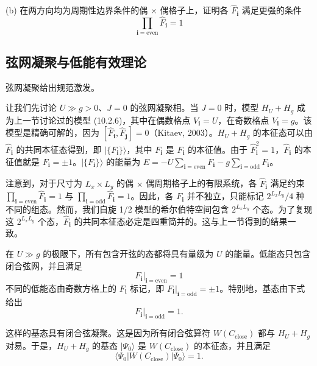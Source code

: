 (b) 在两方向均为周期性边界条件的偶 $\times$ 偶格子上，证明各 $\hat F_{\pmb{i}}$ 满足更强的条件
\begin{equation*}
\prod_{\pmb{i}=\mathrm{even}}\hat F_{\pmb{i}}=1\tag{10.3.4}
\end{equation*}

\subsection{弦网凝聚与低能有效理论}

\begin{keypoints}\item 弦网凝聚给出规范激发。\end{keypoints}

让我们先讨论 $U\gg g>0$、$J=0$ 的弦网凝聚相。当 $J=0$ 时，模型 $H_U+H_g$ 成为上一节讨论过的模型 (10.2.6)，其中在偶数格点 $V_{\pmb{i}}=U$，在奇数格点 $V_{\pmb{i}}=g$。该模型是精确可解的，因为 $[\hat F_{\pmb{i}},\hat F_{\pmb{j}}]=0$（Kitaev, 2003）。$H_U+H_g$ 的本征态可以由 $\hat F_{\pmb{i}}$ 的共同本征态得到，即 $|\{F_{\pmb{i}}\}\rangle$，其中 $F_{\pmb{i}}$ 是 $\hat F_{\pmb{i}}$ 的本征值。由于 $\hat F_{\pmb{i}}^{2}=1$，$\hat F_{\pmb{i}}$ 的本征值就是 $F_{\pmb{i}}=\pm1$。$|\{F_{\pmb{i}}\}\rangle$ 的能量为 $E=-U\sum_{\pmb{i}=\mathrm{even}}F_{\pmb{i}}-g\sum_{\pmb{i}=\mathrm{odd}}F_{\pmb{i}}$。

注意到，对于尺寸为 $L_x\times L_y$ 的偶 $\times$ 偶周期格子上的有限系统，各 $\hat F_{\pmb{i}}$ 满足约束 $\prod_{\pmb{i}=\mathrm{even}}\hat F_{\pmb{i}}=1$ 与 $\prod_{\pmb{i}=\mathrm{odd}}\hat F_{\pmb{i}}=1$。因此，各 $F_{\pmb{i}}$ 并不独立，只能标记 $2^{L_xL_y}/4$ 种不同的组态。然而，我们自旋 1/2 模型的希尔伯特空间包含 $2^{L_xL_y}$ 个态。为了复现这 $2^{L_xL_y}$ 个态，$\hat F_{\pmb{i}}$ 的共同本征态必定是四重简并的。这与上一节得到的结果一致。

在 $U\gg g$ 的极限下，所有包含开弦的态都将具有量级为 $U$ 的能量。低能态只包含闭合弦网，并且满足
\begin{equation*}
F_{\pmb{i}}\big|_{\pmb{i}=\mathrm{even}}=1
\end{equation*}
不同的低能态由奇数方格上的 $F_{\pmb{i}}$ 标记，即 $F_{\pmb{i}}\big|_{\pmb{i}=\mathrm{odd}}=\pm1$。特别地，基态由下式给出
\begin{equation*}
F_{\pmb{i}}\big|_{\pmb{i}=\mathrm{odd}}=1.
\end{equation*}

这样的基态具有闭合弦凝聚。这是因为所有闭合弦算符 $W(C_{\mathrm{close}})$ 都与 $H_U+H_g$ 对易。于是，$H_U+H_g$ 的基态 $|\Psi_0\rangle$ 是 $W(C_{\mathrm{close}})$ 的本征态，并且满足
\begin{equation*}
\langle\Psi_0|W(C_{\mathrm{close}})|\Psi_0\rangle=1.
\end{equation*}

